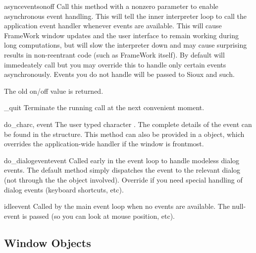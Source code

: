 \begin{methoddesc}[Application]{asyncevents}{onoff}
Call this method with a nonzero parameter to enable
asynchronous event handling. This will tell the inner interpreter loop
to call the application event handler  whenever events
are available. This will cause FrameWork window updates and the user
interface to remain working during long computations, but will slow the
interpreter down and may cause surprising results in non-reentrant code
(such as FrameWork itself). By default  will immedeately
call  but you may override this to handle only certain
events asynchronously. Events you do not handle will be passed to Sioux
and such.

The old on/off value is returned.
\end{methoddesc}

\begin{methoddesc}[Application]{_quit}{}
Terminate the running  call at the next convenient
moment.
\end{methoddesc}

\begin{methoddesc}[Application]{do_char}{c, event}
The user typed character . The complete details of the event
can be found in the  structure. This method can also be
provided in a  object, which overrides the
application-wide handler if the window is frontmost.
\end{methoddesc}

\begin{methoddesc}[Application]{do_dialogevent}{event}
Called early in the event loop to handle modeless dialog events. The
default method simply dispatches the event to the relevant dialog (not
through the the  object involved). Override if you
need special handling of dialog events (keyboard shortcuts, etc).
\end{methoddesc}

\begin{methoddesc}[Application]{idle}{event}
Called by the main event loop when no events are available. The
null-event is passed (so you can look at mouse position, etc).
\end{methoddesc}


\subsection{Window Objects \label{window-objects}}

